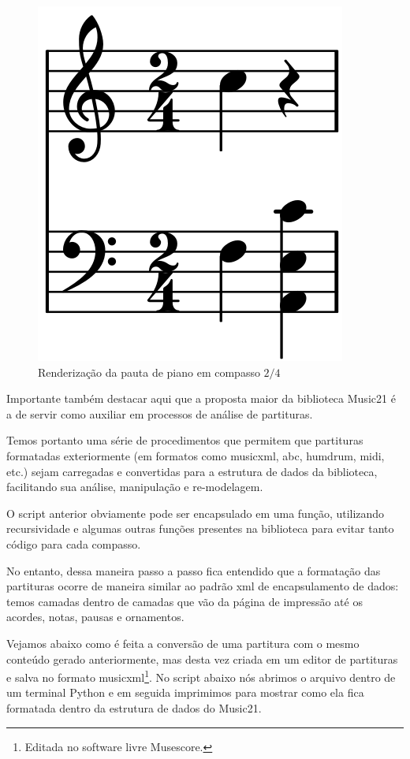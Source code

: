 \documentclass[
	12pt,				%
	openright,			%
	twoside,			%
	a4paper,			%
	english,			%
	french,				%
	spanish,			%
	brazil				%
	]{abntex2}
\begin{document}
\begin{figure}[!h]
	\caption{\label{fig_grafico} Renderização da pauta de piano em compasso $2/4$} 
	\begin{center}
	    \includegraphics[scale=0.25]{estudosM21/pautaM21.png}
	\end{center}
\end{figure}

Importante também destacar aqui que a proposta maior da biblioteca Music21 é a de servir como auxiliar em processos de análise de partituras. 

Temos portanto uma série de procedimentos que permitem que partituras formatadas exteriormente (em formatos como musicxml, abc, humdrum, midi, etc.) sejam carregadas e convertidas para a estrutura de dados da biblioteca, facilitando sua análise, manipulação e re-modelagem. 

O script anterior obviamente pode ser encapsulado em uma função, utilizando recursividade e algumas outras funções presentes na biblioteca para evitar tanto código para cada compasso. 

No entanto, dessa maneira passo a passo fica entendido que a formatação das partituras ocorre de maneira similar ao padrão xml de encapsulamento de dados: temos camadas dentro de camadas que vão da página de impressão até os acordes, notas, pausas e ornamentos.

Vejamos abaixo como é feita a conversão de uma partitura com o mesmo conteúdo gerado anteriormente, mas desta vez criada em um editor de partituras e salva no formato musicxml\footnote{Editada no software livre Musescore.}. No script abaixo nós abrimos o arquivo dentro de um terminal Python e em seguida imprimimos para mostrar como ela fica formatada dentro da estrutura de dados do Music21.
\end{document}
